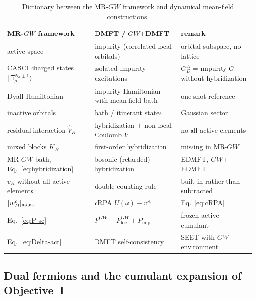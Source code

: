 \documentclass[11pt,a4paper]{article}
\newcommand{\ket}[1]{|#1\rangle}
\newcommand{\GW}{$GW$}
\newcommand{\MRGW}{MR-$GW$}
\newcommand{\imp}{\mathrm{imp}}
\newcommand{\loc}{\mathrm{loc}}
\begin{document}
\begin{table}[h!]
\centering
\small
\begin{tabular}{>{\raggedright\arraybackslash}p{5.2cm}>{\raggedright\arraybackslash}p{5.2cm}>{\raggedright\arraybackslash}p{4.4cm}}
\toprule
\MRGW{} framework & DMFT / \GW{}$+$DMFT & remark\\
\midrule
active space & impurity (correlated local orbitals) & orbital subspace, no lattice\\
CASCI charged states $\ket{\Xi^{N_a\pm1}_\mu}$ & isolated-impurity excitations & $G^A_D$ = impurity $G$ without hybridization\\
Dyall Hamiltonian & impurity Hamiltonian with mean-field bath & one-shot reference\\
inactive orbitals & bath / itinerant states & Gaussian sector\\
residual interaction $\hat V_R$ & hybridization $+$ non-local Coulomb $V$ & no all-active elements\\
mixed blocks $K_B$ & first-order hybridization & missing in \MRGW{}\\
\MRGW{} bath, Eq.~\eqref{eq:hybridization} & bosonic (retarded) hybridization & EDMFT, \GW{}$+$EDMFT\\
$v_R$ without all-active elements & double-counting rule & built in rather than subtracted\\
$[w^c_D]_{\rm aa,aa}$ & cRPA $U(\omega)-v^A$ & Eq.~\eqref{eq:cRPA}\\
Eq.~\eqref{eq:P-sc} & $P^{GW}-P^{GW}_{\loc}+P_{\imp}$ & frozen active cumulant\\
Eq.~\eqref{eq:Delta-act} & DMFT self-consistency & SEET with \GW{} environment\\
\bottomrule
\end{tabular}
\caption{Dictionary between the \MRGW{} framework and dynamical mean-field
constructions.}
\label{tab:dmft}
\end{table}

\subsection{Dual fermions and the cumulant expansion of Objective~I}
\end{document}
